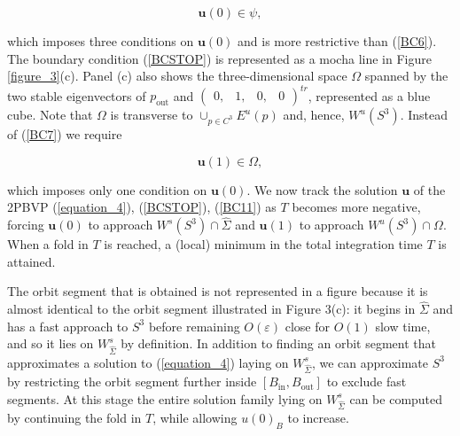 \documentclass{ws-ijbc}
\begin{document}
    
\begin{equation}
\mathbf{u}(0) \in \psi,
\label{BCSTOP}
\end{equation}
    
\noindent
which imposes three conditions on $\mathbf{u}(0)$ and is more restrictive than (\ref{BC6}).  The boundary condition (\ref{BCSTOP}) is represented as a mocha line in Figure \ref{figure_3}(c).  Panel (c) also shows the three-dimensional space $\Omega$ spanned by the two stable eigenvectors of $p_{\text{out}}$ and $\begin{pmatrix} 0, & 1, & 0, & 0 \end{pmatrix}^{tr}$, represented as a blue cube.  Note that $\Omega$ is transverse to $\cup_{p \in C^3}E^u(p)$ and, hence, $W^u(S^3)$.  Instead of (\ref{BC7}) we require
    
\begin{equation}
\mathbf{u}(1) \in \Omega,
\label{BC11}
\end{equation}
    
\noindent
which imposes only one condition on $\mathbf{u}(0)$.  We now track the solution $\mathbf{u}$ of the 2PBVP (\ref{equation_4}), (\ref{BCSTOP}), (\ref{BC11}) as $T$ becomes more negative, forcing $\mathbf{u}(0)$ to approach $W^s(S^3) \cap \widehat{\Sigma}$ and $\mathbf{u}(1)$ to approach $W^u(S^3) \cap \Omega$. When a fold in $T$ is reached, a (local) minimum in the total integration time $T$ is attained.

The orbit segment that is obtained is not represented in a figure because it is almost identical to the orbit segment illustrated in Figure 3(c): it begins in $\widehat{\Sigma}$ and has a fast approach to $S^3$ before remaining $O(\varepsilon)$ close for $O(1)$ slow time, and so it lies on $W^{s}_{\widehat{\Sigma}}$ by definition.  In addition to finding an orbit segment that approximates a solution to (\ref{equation_4}) laying on $W^s_{\widehat{\Sigma}}$, we can approximate $S^3$ by restricting the orbit segment further inside $[B_{\text{in}},B_{\text{out}}]$ to exclude fast segments. At this stage the entire solution family lying on $W^s_{\widehat{\Sigma}}$ can be computed by continuing the fold in $T$, while allowing $u(0)_B$ to increase.
\end{document}
